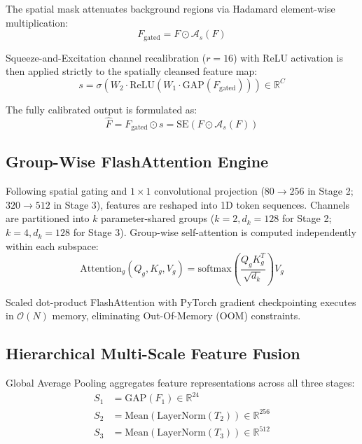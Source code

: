 \documentclass[conference]{IEEEtran}
\let\origsubsection\subsection
\renewcommand{\subsection}{\needspace{5\baselineskip}\origsubsection}
\begin{document}
The spatial mask attenuates background regions via Hadamard element-wise multiplication:
\begin{equation}
F_{\text{gated}} = F \odot \mathcal{A}_s(F)
\end{equation}

Squeeze-and-Excitation channel recalibration ($r=16$) with ReLU activation is then applied strictly to the spatially cleansed feature map:
\begin{equation}
s = \sigma\left(W_2 \cdot \text{ReLU}\left(W_1 \cdot \text{GAP}(F_{\text{gated}})\right)\right) \in \mathbb{R}^C
\end{equation}

The fully calibrated output is formulated as:
\begin{equation}
\hat{F} = F_{\text{gated}} \odot s = \text{SE}\left(F \odot \mathcal{A}_s(F)\right)
\end{equation}

\subsection{Group-Wise FlashAttention Engine}
Following spatial gating and $1 \times 1$ convolutional projection ($80 \rightarrow 256$ in Stage 2; $320 \rightarrow 512$ in Stage 3), features are reshaped into 1D token sequences. Channels are partitioned into $k$ parameter-shared groups ($k=2, d_k=128$ for Stage 2; $k=4, d_k=128$ for Stage 3). Group-wise self-attention is computed independently within each subspace:
\begin{equation}
\text{Attention}_g(Q_g, K_g, V_g) = \text{softmax}\left(\frac{Q_g K_g^T}{\sqrt{d_k}}\right) V_g
\end{equation}

Scaled dot-product FlashAttention with PyTorch gradient checkpointing executes in $\mathcal{O}(N)$ memory, eliminating Out-Of-Memory (OOM) constraints.

\subsection{Hierarchical Multi-Scale Feature Fusion}
Global Average Pooling aggregates feature representations across all three stages:
\begin{align}
S_1 &= \text{GAP}(F_1) \in \mathbb{R}^{24} \\
S_2 &= \text{Mean}(\text{LayerNorm}(T_2)) \in \mathbb{R}^{256} \\
S_3 &= \text{Mean}(\text{LayerNorm}(T_3)) \in \mathbb{R}^{512}
\end{align}
\end{document}
